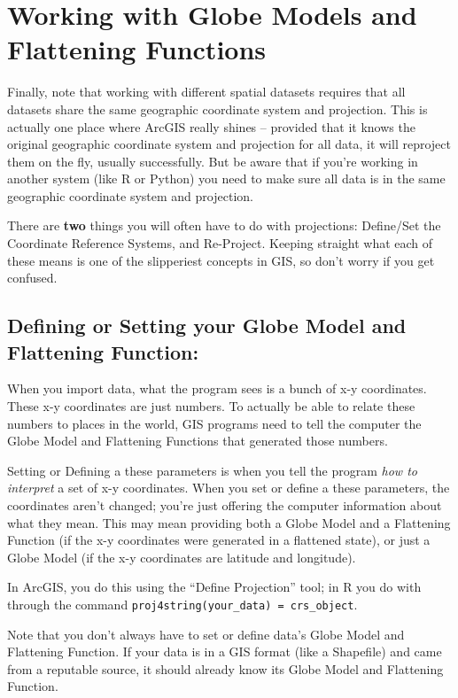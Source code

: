 \documentclass[11pt]{article}
\begin{document}
\section{Working with Globe Models and Flattening Functions}

Finally, note that working with different spatial datasets requires that all datasets share the same geographic coordinate system and projection. This is actually one place where ArcGIS really shines -- provided that it knows the original geographic coordinate system and projection for all data, it will reproject them on the fly, usually successfully. But be aware that if you're working in another system (like R or Python) you need to make sure all data is in the same geographic coordinate system and projection.

There are \textbf{two} things you will often have to do with projections: Define/Set the Coordinate Reference Systems, and Re-Project. Keeping straight what each of these means is one of the slipperiest concepts in GIS, so don't worry if you get confused.

\subsection{Defining or Setting your Globe Model and Flattening Function:} When you import data, what the program sees is a bunch of x-y coordinates. These x-y coordinates are just numbers. To actually be able to relate these numbers to places in the world, GIS programs need to tell the computer the Globe Model and Flattening Functions that generated those numbers.

Setting or Defining a these parameters is when you tell the program \emph{how to interpret} a set of x-y coordinates. When you set or define a these parameters, the coordinates aren't changed; you're just offering the computer information about what they mean. This may mean providing both a Globe Model and a Flattening Function (if the x-y coordinates were generated in a flattened state), or just a Globe Model (if the x-y coordinates are latitude and longitude).

In ArcGIS, you do this using the ``Define Projection'' tool; in R you do with through the command \texttt{proj4string(your\_data) = crs\_object}.

Note that you don't always have to set or define data's Globe Model and Flattening Function. If your data is in a GIS format (like a Shapefile) and came from a reputable source, it should already know its Globe Model and Flattening Function.
\end{document}
